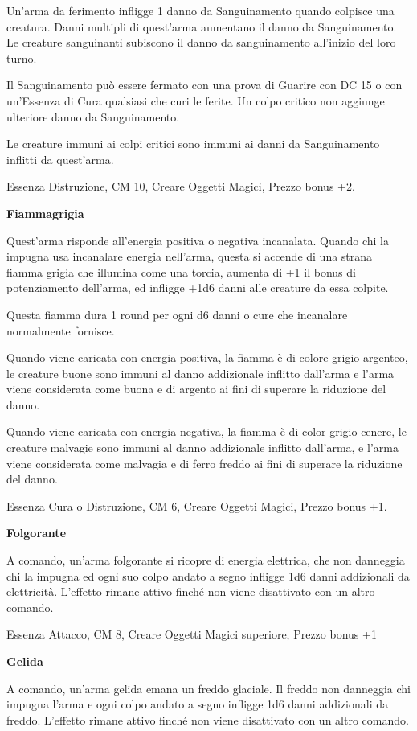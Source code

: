 \documentclass[a4paper,11pt,twoside,openany]{book}
\begin{document}
Un'arma da ferimento infligge 1 danno da Sanguinamento quando colpisce una creatura. Danni multipli di quest'arma aumentano il danno da Sanguinamento. Le creature sanguinanti subiscono il danno da sanguinamento all'inizio del loro turno.

Il Sanguinamento può essere fermato con una prova di Guarire con DC 15 o con un'Essenza di Cura qualsiasi che curi le ferite. Un colpo critico non aggiunge ulteriore danno da Sanguinamento.

Le creature immuni ai colpi critici sono immuni ai danni da Sanguinamento inflitti da quest'arma.

Essenza Distruzione, CM 10, Creare Oggetti Magici, Prezzo bonus +2.

\textbf{Fiammagrigia}

Quest’arma risponde all'energia positiva o negativa incanalata. Quando chi la impugna usa incanalare energia nell'arma, questa si accende di una strana fiamma grigia che illumina come una torcia, aumenta di +1 il bonus di potenziamento dell'arma, ed infligge +1d6 danni alle creature da essa colpite.

Questa fiamma dura 1 round per ogni d6 danni o cure che incanalare normalmente fornisce.

Quando viene caricata con energia positiva, la fiamma è di colore grigio argenteo, le creature buone sono immuni al danno addizionale inflitto dall'arma e l’arma viene considerata come buona e di argento ai fini di superare la riduzione del danno.

Quando viene caricata con energia negativa, la fiamma è di color grigio cenere, le creature malvagie sono immuni al danno addizionale inflitto dall'arma, e l'arma viene considerata come malvagia e di ferro freddo ai fini di superare la riduzione del danno.

Essenza Cura o Distruzione, CM 6, Creare Oggetti Magici, Prezzo bonus +1.

\textbf{Folgorante}

A comando, un'arma folgorante si ricopre di energia elettrica, che non danneggia chi la impugna ed ogni suo colpo andato a segno infligge 1d6 danni addizionali da elettricità. L'effetto rimane attivo finché non viene disattivato con un altro comando.

Essenza Attacco, CM 8, Creare Oggetti Magici superiore, Prezzo bonus +1

\textbf{Gelida}

A comando, un'arma gelida emana un freddo glaciale. Il freddo non danneggia chi impugna l'arma e ogni colpo andato a segno infligge 1d6 danni addizionali da freddo. L'effetto rimane attivo finché non viene disattivato con un altro comando.
\end{document}
